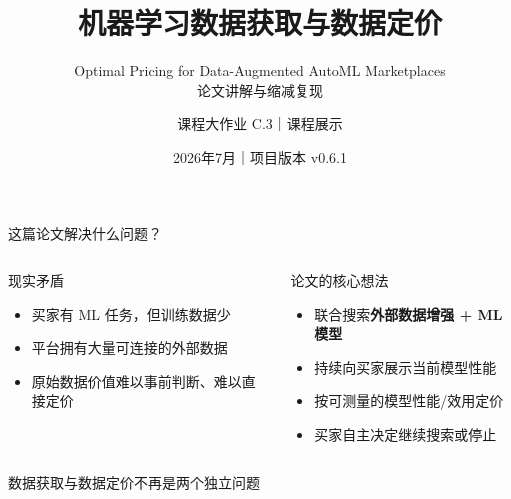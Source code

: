 \documentclass[aspectratio=169,10pt]{ctexbeamer}
\title{机器学习数据获取与数据定价}
\subtitle{Optimal Pricing for Data-Augmented AutoML Marketplaces\\论文讲解与缩减复现}
\author{课程大作业 C.3｜课程展示}
\date{2026年7月｜项目版本 v0.6.1}
\begin{document}
\begin{frame}
  \titlepage
\end{frame}

\begin{frame}{这篇论文解决什么问题？}
\begin{columns}[T,onlytextwidth]
\begin{block}{现实矛盾}
\begin{itemize}
  \item 买家有 ML 任务，但训练数据少
  \item 平台拥有大量可连接的外部数据
  \item 原始数据价值难以事前判断、难以直接定价
\end{itemize}
\end{block}
\begin{exampleblock}{论文的核心想法}
\begin{itemize}
  \item 联合搜索\textbf{外部数据增强 + ML 模型}
  \item 持续向买家展示当前模型性能
  \item 按可测量的模型性能/效用定价
  \item 买家自主决定继续搜索或停止
\end{itemize}
\end{exampleblock}
\end{columns}
\vspace{0.5em}
\centering
\large 数据获取与数据定价不再是两个独立问题
\end{frame}
\end{document}
